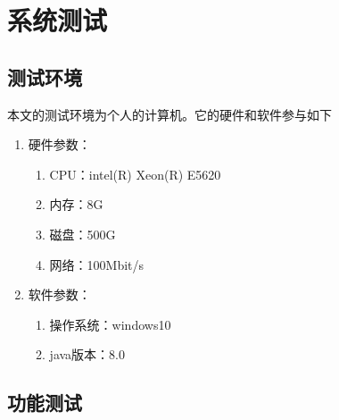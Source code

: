 
\chapter{系统测试}
\section{测试环境}
本文的测试环境为个人的计算机。它的硬件和软件参与如下
\begin{enumerate}
	\item 硬件参数：
	\begin{enumerate}
		\item CPU：intel(R) Xeon(R) E5620
		\item 内存：8G
		\item 磁盘：500G
		\item 网络：100Mbit/s
	\end{enumerate}
\item 软件参数：
\begin{enumerate}
	\item 操作系统：windows10
	\item java版本：8.0
\end{enumerate}
\end{enumerate}
\section{功能测试}
